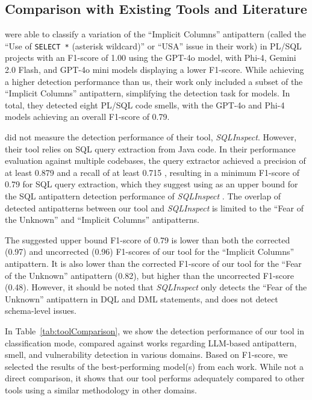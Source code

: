 \subsection{Comparison with Existing Tools and Literature}\label{sec:comparison}

 were able to classify a variation of the “Implicit Columns” antipattern (called the “Use of \texttt{SELECT *} (asterisk wildcard)” or “USA” issue in their work) in PL/SQL projects with an F1-score of \num{1.00} using the GPT-4o model, with Phi-4, Gemini 2.0 Flash, and GPT-4o mini models displaying a lower F1-score. While achieving a higher detection performance than us, their work only included a subset of the “Implicit Columns” antipattern, simplifying the detection task for models. In total, they detected eight PL/SQL code smells, with the GPT-4o and Phi-4 models achieving an overall F1-score of \num{0.79}.

 did not measure the detection performance of their tool, \emph{SQLInspect}. However, their tool relies on SQL query extraction from Java code. In their performance evaluation against multiple codebases, the query extractor achieved a precision of at least \num{0.879} and a recall of at least \num{0.715} , resulting in a minimum F1-score of \num{0.79} for SQL query extraction, which they suggest using as an upper bound for the SQL antipattern detection performance of \emph{SQLInspect} . The overlap of detected antipatterns between our tool and \emph{SQLInspect} is limited to the “Fear of the Unknown” and “Implicit Columns” antipatterns.

The suggested upper bound F1-score of \num{0.79} is lower than both the corrected (\num{0.97}) and uncorrected (\num{0.96}) F1-scores of our tool for the “Implicit Columns” antipattern. It is also lower than the corrected F1-score of our tool for the “Fear of the Unknown” antipattern (\num{0.82}), but higher than the uncorrected F1-score (\num{0.48}). However, it should be noted that \emph{SQLInspect} only detects the “Fear of the Unknown” antipattern in DQL and DML statements, and does not detect schema-level issues.

In Table~\ref{tab:toolComparison}, we show the detection performance of our tool in classification mode, compared against works regarding LLM-based antipattern, smell, and vulnerability detection in various domains. Based on F1-score, we selected the results of the best-performing model(s) from each work. While not a direct comparison, it shows that our tool performs adequately compared to other tools using a similar methodology in other domains.

